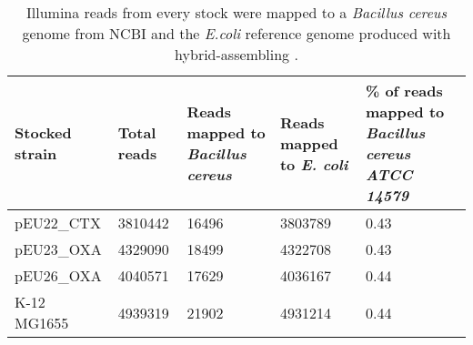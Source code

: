 \begin{table}[H]
	\begin{tabularx}{\linewidth}{|LLLLL|}
		\hline
		Stocked strain    & Total reads & Reads mapped to \textit{Bacillus cereus} & Reads mapped to \textit{E. coli} & \% of reads mapped to \textit{Bacillus cereus ATCC 14579} \\ \hline
		pEU22\_CTX & 3810442     & 16496                                                     & 3803789                                           & 0.43                                                            \\ \hline
		pEU23\_OXA & 4329090     & 18499                                                     & 4322708                                           & 0.43                                                            \\ \hline
		pEU26\_OXA & 4040571     & 17629                                                     & 4036167                                           & 0.44                                                            \\ \hline
		K-12 MG1655      & 4939319     & 21902                                                     & 4931214                                           & 0.44                                                            \\ \hline
	\end{tabularx}
	\caption{Illumina reads from every stock were mapped to a \textit{Bacillus cereus} genome from NCBI and the \textit{E.coli} reference genome produced with  hybrid-assembling \cite{noauthor_bacillus_nodate}.}
	\label{table:bacillus_reads}
\end{table}
